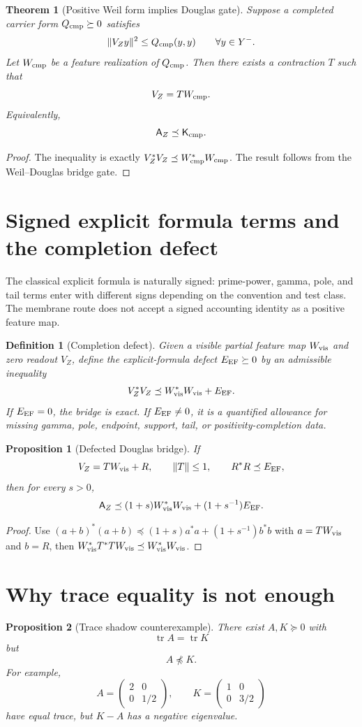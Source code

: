 \documentclass[11pt]{article}
\newtheorem{theorem}{Theorem}
\newtheorem{proposition}{Proposition}
\newtheorem{definition}{Definition}
\DeclareMathOperator{\tr}{tr}
\newcommand{\Kcmp}{\mathsf K_{\rm cmp}}
\newcommand{\AZ}{\mathsf A_Z}
\newcommand{\Eef}{E_{\rm EF}}
\begin{document}
\begin{theorem}[Positive Weil form implies Douglas gate]
Suppose a completed carrier form $Q_{\rm cmp}\succeq0$ satisfies
\[
   \|V_Z y\|^2\le Q_{\rm cmp}(y,y)
   \qquad\forall y\in Y^-.
\]
Let $W_{\rm cmp}$ be a feature realization of $Q_{\rm cmp}$.  Then there exists a contraction $T$ such that
\[
   V_Z=T W_{\rm cmp}.
\]
Equivalently,
\[
   \AZ\preceq\Kcmp.
\]
\end{theorem}

\begin{proof}
The inequality is exactly $V_Z^*V_Z\preceq W_{\rm cmp}^*W_{\rm cmp}$.  The result follows from the Weil--Douglas bridge gate.
\end{proof}

\section{Signed explicit formula terms and the completion defect}
The classical explicit formula is naturally signed: prime-power, gamma, pole, and tail terms enter with different signs depending on the convention and test class.  The membrane route does not accept a signed accounting identity as a positive feature map.

\begin{definition}[Completion defect]
Given a visible partial feature map $W_{\rm vis}$ and zero readout $V_Z$, define the explicit-formula defect $\Eef\succeq0$ by an admissible inequality
\[
   V_Z^*V_Z\preceq W_{\rm vis}^*W_{\rm vis}+\Eef.
\]
If $\Eef=0$, the bridge is exact.  If $\Eef\ne0$, it is a quantified allowance for missing gamma, pole, endpoint, support, tail, or positivity-completion data.
\end{definition}

\begin{proposition}[Defected Douglas bridge]
If
\[
   V_Z=T W_{\rm vis}+R,
   \qquad \|T\|\le1,
   \qquad R^*R\preceq\Eef,
\]
then for every $s>0$,
\[
   \AZ\preceq (1+s)W_{\rm vis}^*W_{\rm vis}+(1+s^{-1})\Eef.
\]
\end{proposition}

\begin{proof}
Use $(a+b)^*(a+b)\preceq (1+s)a^*a+(1+s^{-1})b^*b$ with $a=TW_{\rm vis}$ and $b=R$, then $W_{\rm vis}^*T^*TW_{\rm vis}\preceq W_{\rm vis}^*W_{\rm vis}$.
\end{proof}

\section{Why trace equality is not enough}
\begin{proposition}[Trace shadow counterexample]
There exist $A,K\succeq0$ with
\[
   \tr A=\tr K
\]
but
\[
   A\npreceq K.
\]
For example,
\[
   A=\begin{pmatrix}2&0\\0&1/2\end{pmatrix},
   \qquad
   K=\begin{pmatrix}1&0\\0&3/2\end{pmatrix}
\]
have equal trace, but $K-A$ has a negative eigenvalue.
\end{proposition}
\end{document}
